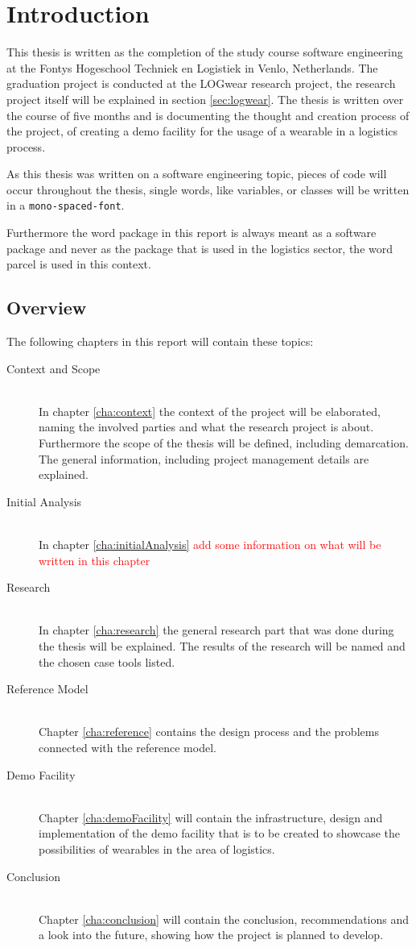 \chapter{Introduction}
This thesis is written as the completion of the study course software engineering at the Fontys Hogeschool Techniek en Logistiek in Venlo, Netherlands. The graduation project is conducted at the LOGwear research project, the research project itself will be explained in section \ref{sec:logwear}. The thesis is written over the course of five months and is documenting the thought and creation process of the project, of creating a demo facility for the usage of a wearable in a logistics process.

As this thesis was written on a software engineering topic, pieces of code will occur throughout the thesis, single words, like variables, or classes will be written in a \texttt{mono-spaced-font}. 

Furthermore the word \gls{package} in this report is always meant as a software package and never as the package that is used in the logistics sector, the word \gls{parcel} is used in this context.
\section*{Overview}
The following chapters in this report will contain these topics:

\begin{description}
	\item[Context and Scope] \hfill \\
	In chapter \ref{cha:context} the context of the project will be elaborated, naming the involved parties and what the research project is about. Furthermore the scope of the thesis will be defined, including demarcation. The general information, including project management details are explained.
	\item[Initial Analysis] \hfill \\
	In chapter \ref{cha:initialAnalysis} \textcolor{red}{add some information on what will be written in this chapter}
	\item[Research] \hfill \\
	In chapter \ref{cha:research} the general research part that was done during the thesis will be explained. The results of the research will be named and the chosen \gls{case} tools listed.
	\item[Reference Model] \hfill \\
	Chapter \ref{cha:reference} contains the design process and the problems connected with the reference model.
	\item[Demo Facility] \hfill \\
	Chapter \ref{cha:demoFacility} will contain the infrastructure, design and implementation of the demo facility that is to be created to showcase the possibilities of wearables in the area of logistics.
	\item[Conclusion] \hfill \\
	Chapter \ref{cha:conclusion} will contain the conclusion, recommendations and a look into the future, showing how the project is planned to develop.
\end{description}